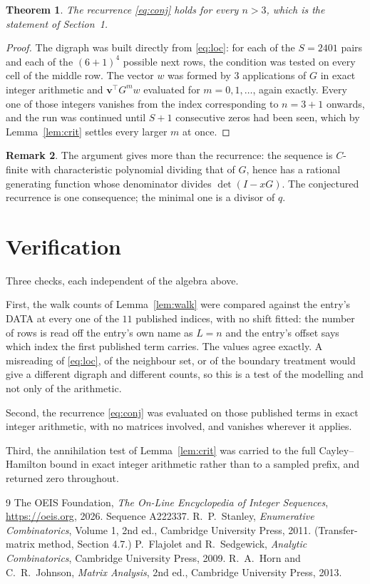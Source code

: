 \documentclass[11pt,a4paper]{article}
\theoremstyle{plain}
\newtheorem{theorem}{Theorem}
\theoremstyle{definition}
\newtheorem{remark}[theorem]{Remark}
\begin{document}
\begin{theorem}
The recurrence \eqref{eq:conj} holds for every $n>3$, which is the statement of
Section~1.
\end{theorem}

\begin{proof}
The digraph was built directly from \eqref{eq:loc}: for each of the $S=2401$ pairs and each
of the $(6+1)^{4}$ possible next rows, the condition was tested on every cell of
the middle row. The vector $w$ was formed by $3$ applications of $G$ in exact integer
arithmetic and $\mathbf{v}^{\!\top}G^{m}w$ evaluated for $m=0,1,\dots$, again exactly.
Every one of those integers vanishes from the index corresponding to $n=3+1$ onwards,
and the run was continued until $S+1$ consecutive zeros had been seen, which by
Lemma~\ref{lem:crit} settles every larger $m$ at once.
\end{proof}

\begin{remark}
The argument gives more than the recurrence: the sequence is $C$-finite with characteristic
polynomial dividing that of $G$, hence has a rational generating function whose denominator
divides $\det(I-xG)$. The conjectured recurrence is one consequence; the minimal one is a
divisor of $q$.
\end{remark}

\section{Verification}

Three checks, each independent of the algebra above.

First, the walk counts of Lemma~\ref{lem:walk} were compared against the entry's DATA at
every one of the $11$ published indices, with no shift fitted: the number of rows is
read off the entry's own name as $L=n$ and the entry's offset says which index the first
published term carries. The values agree exactly. A misreading of \eqref{eq:loc}, of the
neighbour set, or of the boundary treatment would give a different digraph and different
counts, so this is a test of the modelling and not only of the arithmetic.

Second, the recurrence \eqref{eq:conj} was evaluated on those published terms in exact
integer arithmetic, with no matrices involved, and vanishes wherever it applies.

Third, the annihilation test of Lemma~\ref{lem:crit} was carried to the full
Cayley--Hamilton bound in exact integer arithmetic rather than to a sampled prefix, and
returned zero throughout.

\begin{thebibliography}{9}
 The OEIS Foundation, \emph{The On-Line Encyclopedia of Integer
Sequences}, \url{https://oeis.org}, 2026. Sequence A222337.
 R.~P.~Stanley, \emph{Enumerative Combinatorics}, Volume 1, 2nd ed.,
Cambridge University Press, 2011. (Transfer-matrix method, Section 4.7.)
 P.~Flajolet and R.~Sedgewick, \emph{Analytic Combinatorics}, Cambridge
University Press, 2009.
 R.~A.~Horn and C.~R.~Johnson, \emph{Matrix Analysis}, 2nd ed., Cambridge
University Press, 2013.
\end{thebibliography}
\end{document}
